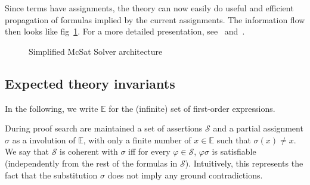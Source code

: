 Since terms have assignments, the theory can now easily do useful and efficient
propagation of formulas implied by the current assignments.
The information flow then looks like fig~\ref{fig:mcsat_flow}.
For a more detailed presentation, see~\cite{FMCAD13} and~\cite{VMCAI13}.

\begin{figure}
  \begin{center}
  \end{center}
  \caption{Simplified McSat Solver architecture}\label{fig:mcsat_flow}
\end{figure}

\subsection{Expected theory invariants}

In the following, we write $\mathbb{E}$ for the (infinite) set of first-order
expressions.

During proof search are maintained a set of assertions $\mathcal{S}$
and a partial assignment $\sigma$ as a involution of $\mathbb{E}$,
with only a finite number of $x \in \mathbb{E}$ such that $\sigma(x) \neq x$.
We say that $\mathcal{S}$ is coherent with $\sigma$ iff for every $\varphi \in \mathcal{S}$,
$\varphi\sigma$ is satisfiable (independently from the rest of the formulas in $\mathcal{S}$).
Intuitively, this represents the fact that the substitution $\sigma$ does not imply any
ground contradictions.

